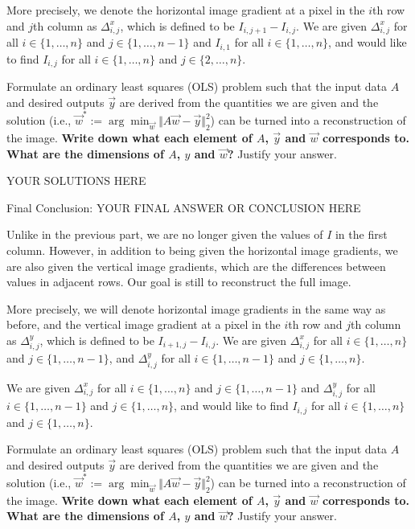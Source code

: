 More precisely, we denote the horizontal image gradient at a pixel in the $i$th row and $j$th column as $\Delta^{x}_{i,j}$, which is defined to be $I_{i, j + 1} - I_{i, j}$. We are given $\Delta^{x}_{i,j}$ for all $i \in \{1, \ldots, n\}$ and $j \in \{1, \ldots, n - 1\}$ and $I_{i,1}$ for all $i \in \{1, \ldots, n\}$, and would like to find $I_{i,j}$ for all $i \in \{1, \ldots, n\}$ and $j \in \{2, \ldots, n\}$. 

Formulate an ordinary least squares (OLS) problem such that the input data $A$ and desired outputs $\vec{y}$ are derived from the quantities we are given and the solution (i.e., $\vec{w}^* := \arg\min_{\vec{w}} \Vert A\vec{w} - \vec{y} \Vert_2^2$) can be turned into a reconstruction of the image. \textbf{Write down what each element of $A$, $\vec{y}$ and $\vec{w}$ corresponds to. What are the dimensions of $A$, $y$ and $\vec{w}$?} Justify your answer. 

\begin{solution}

YOUR SOLUTIONS HERE

{\color{red} Final Conclusion: YOUR FINAL ANSWER OR CONCLUSION HERE}

\end{solution}

\qpart{[5 points]}

Unlike in the previous part, we are no longer given the values of $I$ in the first column. However, in addition to being given the horizontal image gradients, we are also given the vertical image gradients, which are the differences between values in adjacent rows. Our goal is still to reconstruct the full image. 

More precisely, we will denote horizontal image gradients in the same way as before, and the vertical image gradient at a pixel in the $i$th row and $j$th column as $\Delta^{y}_{i,j}$, which is defined to be $I_{i + 1, j} - I_{i, j}$. We are given $\Delta^{x}_{i,j}$ for all $i \in \{1, \ldots, n\}$ and $j \in \{1, \ldots, n - 1\}$, and $\Delta^{y}_{i,j}$ for all $i \in \{1, \ldots, n - 1\}$ and $j \in \{1, \ldots, n\}$. 

We are given $\Delta^{x}_{i,j}$ for all $i \in \{1, \ldots, n\}$ and $j \in \{1, \ldots, n - 1\}$ and $\Delta^{y}_{i,j}$ for all $i \in \{1, \ldots, n - 1\}$ and $j \in \{1, \ldots, n\}$, and would like to find $I_{i,j}$ for all $i \in \{1, \ldots, n\}$ and $j \in \{1, \ldots, n\}$. 

Formulate an ordinary least squares (OLS) problem such that the input data $A$ and desired outputs $\vec{y}$ are derived from the quantities we are given and the solution (i.e., $\vec{w}^* := \arg\min_{\vec{w}} \Vert A\vec{w} - \vec{y} \Vert_2^2$) can be turned into a reconstruction of the image. \textbf{Write down what each element of $A$, $\vec{y}$ and $\vec{w}$ corresponds to. What are the dimensions of $A$, $y$ and $\vec{w}$?} Justify your answer. 

